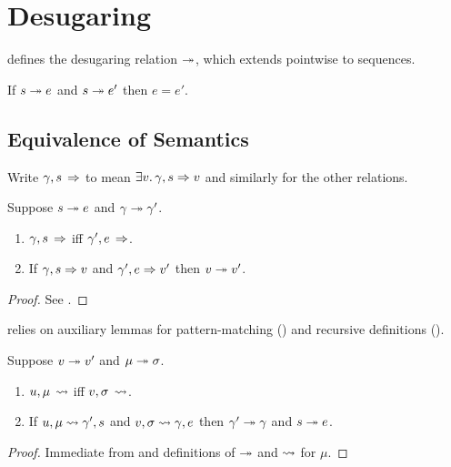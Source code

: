 \section{Desugaring}

 defines the desugaring relation $\twoheadrightarrow$, which extends pointwise to sequences.

\begin{lemma}
   \label{lem:desugar:determinism}
   If $s \twoheadrightarrow e$ and $s \twoheadrightarrow e'$ then $e = e'$.
\end{lemma}





\subsection{Equivalence of Semantics}

Write $\gamma, s\,\Rightarrow$ to mean $\exists v.\,\gamma, s \Rightarrow v$ and similarly for the other
relations.

\begin{theorem}
   \label{thm:semantics-eq}
   Suppose $s \twoheadrightarrow e$ and $\gamma \twoheadrightarrow \gamma'$.
   \begin{enumerate}
      \item $\gamma, s\,\Rightarrow$ iff $\gamma', e\,\Rightarrow$.
      \item If $\gamma, s \Rightarrow v$ and $\gamma',e \Rightarrow v'$ then $v \twoheadrightarrow v'$.
   \end{enumerate}
\end{theorem}
\begin{proof}
   See .
\end{proof}

 relies on auxiliary lemmas for pattern-matching () and recursive
definitions ().

\begin{lemma}
   \label{lem:match-eq}
   Suppose $v \twoheadrightarrow v'$ and $\mu \twoheadrightarrow \sigma$.
   \hfill
   \begin{enumerate}
      \item $u, \mu\,\rightsquigarrow$ iff $v,\sigma\,\rightsquigarrow$.
      \item If $u, \mu \rightsquigarrow \gamma', s$ and $v, \sigma \rightsquigarrow \gamma, e$ then $\gamma' \twoheadrightarrow \gamma$ and $s \twoheadrightarrow e$.
   \end{enumerate}
\end{lemma}
\begin{proof}
   Immediate from  and definitions of $\twoheadrightarrow$ and $\rightsquigarrow$ for $\mu$.
\end{proof}

